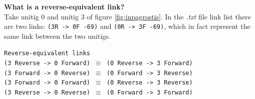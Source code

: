 \documentclass[12pt]{article}
\begin{document}
\textbf{What is a reverse-equivalent link?}\\ Take unitig 0 and unitig 3 of figure \ref{fig:inpagrostis}. In the \textit{.txt} file link list there are two links: \texttt{(3R -> 0F -69)} and \texttt{(0R -> 3F -69)}, which in fact represent the same link between the two unitigs. \\
\vspace{-0.7cm}
\begin{center}
\texttt{Reverse-equivalent links}\\
\texttt{(3 Reverse -> 0 Forward) $\equiv$ (0 Reverse -> 3 Forward)}\\
\texttt{(3 Forward -> 0 Reverse) $\equiv$ (0 Forward -> 3 Reverse)}\\
\texttt{(3 Forward -> 0 Forward) $\equiv$ (0 Reverse -> 3 Reverse)}\\
\texttt{(3 Reverse -> 0 Reverse) $\equiv$ (0 Forward ->  3 Forward)}\\
\vspace{-0.5cm}
\end{center}
\end{document}
